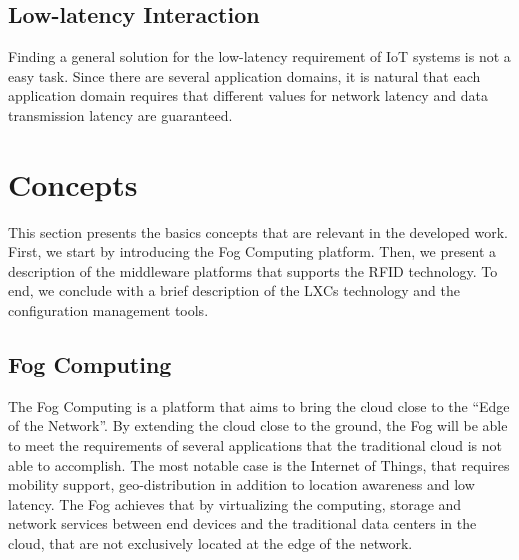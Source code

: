 \subsection{Low-latency Interaction}
\label{sub:low_latency_interaction}
Finding a general solution for the low-latency requirement of \gls{IoT} systems is not a easy task.
Since there are several application domains, it is natural that each application domain requires
that different values for network latency and data transmission latency are guaranteed.

\section{Concepts}
\label{sec:Concepts}
This section presents the basics concepts that are relevant in the developed work. First, we start by
introducing the Fog Computing platform. Then, we present a description of the middleware platforms that
supports the \gls{RFID} technology. To end, we conclude with a brief description of the \glspl{LXC} technology
and the configuration management tools.

\subsection{Fog Computing}
\label{sub:fog_computing}
The Fog Computing \cite{bonomi2012fog} is a platform that aims to bring the cloud close to the ``Edge
of the Network''. By extending the cloud close to the ground, the Fog will be able to meet the requirements
of several applications that the traditional cloud is not able to accomplish. The most notable case
is the Internet of Things, that requires mobility support, geo-distribution in addition to location
awareness and low latency. The Fog achieves that by virtualizing the computing, storage and network
services between end devices and the traditional data centers in the cloud, that are not exclusively
located at the edge of the network.\\

